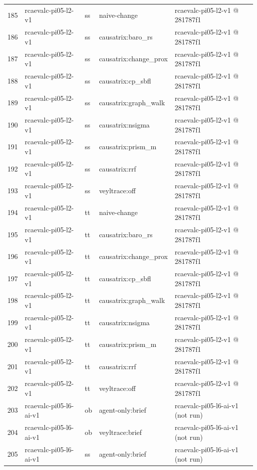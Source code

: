 \begin{longtable}{@{}r>{\raggedright\arraybackslash}p{87.0pt}>{\raggedright\arraybackslash}p{18.0pt}>{\raggedright\arraybackslash}p{63.0pt}>{\raggedright\arraybackslash}p{108.0pt}@{}}
185 & rcaevalc-pi05-l2-v1 & ss & naive-change & rcaevalc-pi05-l2-v1 @ 281787f1 \\
186 & rcaevalc-pi05-l2-v1 & ss & causatrix:baro\_rs & rcaevalc-pi05-l2-v1 @ 281787f1 \\
187 & rcaevalc-pi05-l2-v1 & ss & causatrix:change\_prox & rcaevalc-pi05-l2-v1 @ 281787f1 \\
188 & rcaevalc-pi05-l2-v1 & ss & causatrix:cp\_sbfl & rcaevalc-pi05-l2-v1 @ 281787f1 \\
189 & rcaevalc-pi05-l2-v1 & ss & causatrix:graph\_walk & rcaevalc-pi05-l2-v1 @ 281787f1 \\
190 & rcaevalc-pi05-l2-v1 & ss & causatrix:nsigma & rcaevalc-pi05-l2-v1 @ 281787f1 \\
191 & rcaevalc-pi05-l2-v1 & ss & causatrix:prism\_m & rcaevalc-pi05-l2-v1 @ 281787f1 \\
192 & rcaevalc-pi05-l2-v1 & ss & causatrix:rrf & rcaevalc-pi05-l2-v1 @ 281787f1 \\
193 & rcaevalc-pi05-l2-v1 & ss & veyltrace:off & rcaevalc-pi05-l2-v1 @ 281787f1 \\
194 & rcaevalc-pi05-l2-v1 & tt & naive-change & rcaevalc-pi05-l2-v1 @ 281787f1 \\
195 & rcaevalc-pi05-l2-v1 & tt & causatrix:baro\_rs & rcaevalc-pi05-l2-v1 @ 281787f1 \\
196 & rcaevalc-pi05-l2-v1 & tt & causatrix:change\_prox & rcaevalc-pi05-l2-v1 @ 281787f1 \\
197 & rcaevalc-pi05-l2-v1 & tt & causatrix:cp\_sbfl & rcaevalc-pi05-l2-v1 @ 281787f1 \\
198 & rcaevalc-pi05-l2-v1 & tt & causatrix:graph\_walk & rcaevalc-pi05-l2-v1 @ 281787f1 \\
199 & rcaevalc-pi05-l2-v1 & tt & causatrix:nsigma & rcaevalc-pi05-l2-v1 @ 281787f1 \\
200 & rcaevalc-pi05-l2-v1 & tt & causatrix:prism\_m & rcaevalc-pi05-l2-v1 @ 281787f1 \\
201 & rcaevalc-pi05-l2-v1 & tt & causatrix:rrf & rcaevalc-pi05-l2-v1 @ 281787f1 \\
202 & rcaevalc-pi05-l2-v1 & tt & veyltrace:off & rcaevalc-pi05-l2-v1 @ 281787f1 \\
203 & rcaevalc-pi05-l6-ai-v1 & ob & agent-only:brief & rcaevalc-pi05-l6-ai-v1 (not run) \\
204 & rcaevalc-pi05-l6-ai-v1 & ob & veyltrace:brief & rcaevalc-pi05-l6-ai-v1 (not run) \\
205 & rcaevalc-pi05-l6-ai-v1 & ss & agent-only:brief & rcaevalc-pi05-l6-ai-v1 (not run) \\

\end{longtable}
